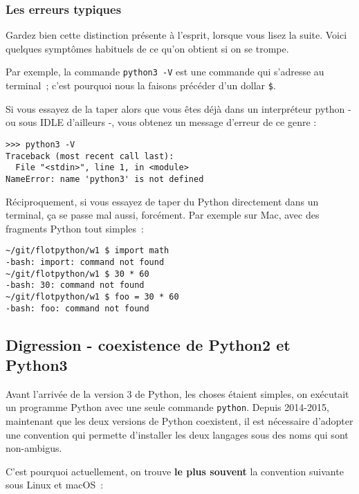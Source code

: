     \hypertarget{les-erreurs-typiques}{%
\subsubsection{Les erreurs typiques}\label{les-erreurs-typiques}}

Gardez bien cette distinction présente à l'esprit, lorsque vous lisez la
suite. Voici quelques symptômes habituels de ce qu'on obtient si on se
trompe.

Par exemple, la commande \texttt{python3\ -V} est une commande qui
s'adresse au terminal~; c'est pourquoi nous la faisons précéder d'un
dollar \texttt{\$}.

Si vous essayez de la taper alors que vous êtes déjà dans un
interpréteur python - ou sous IDLE d'ailleurs -, vous obtenez un message
d'erreur de ce genre :

\begin{verbatim}
>>> python3 -V
Traceback (most recent call last):
  File "<stdin>", line 1, in <module>
NameError: name 'python3' is not defined
\end{verbatim}

    Réciproquement, si vous essayez de taper du Python directement dans un
terminal, ça se passe mal aussi, forcément. Par exemple sur Mac, avec
des fragments Python tout simples~:

\begin{verbatim}
~/git/flotpython/w1 $ import math
-bash: import: command not found
~/git/flotpython/w1 $ 30 * 60
-bash: 30: command not found
~/git/flotpython/w1 $ foo = 30 * 60
-bash: foo: command not found
\end{verbatim}

    \hypertarget{digression---coexistence-de-python2-et-python3}{%
\subsection{Digression - coexistence de Python2 et
Python3}\label{digression---coexistence-de-python2-et-python3}}

    Avant l'arrivée de la version 3 de Python, les choses étaient simples,
on exécutait un programme Python avec une seule commande
\texttt{python}. Depuis 2014-2015, maintenant que les deux versions de
Python coexistent, il est nécessaire d'adopter une convention qui
permette d'installer les deux langages sous des noms qui sont
non-ambigus.

C'est pourquoi actuellement, on trouve \textbf{le plus souvent} la
convention suivante sous Linux et macOS~:

